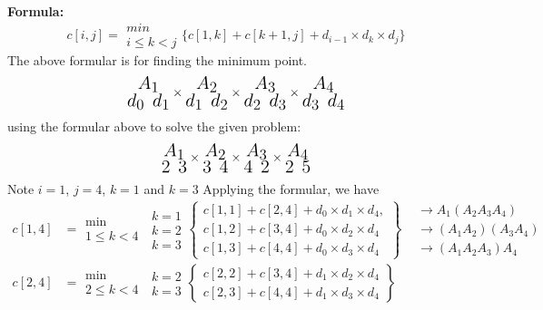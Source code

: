 \documentclass[12pt]{report}
\begin{document}
	\textbf{Formula:}
	$$c[i,j] = \substack{min\\{i\le k < j}}\bigg\{ c[1,k] + c[k+1,j] + d_{i-1} \times d_k\times d_j\bigg\}$$
	The above formular is for finding the minimum point.
	$$\huge\substack{A_1\\ {d_0 ~d_1}} \times \substack{A_2\\ {d_1 ~d_2}} \times \substack{A_3\\ {d_2 ~d_3}}\times \substack{A_4\\ {d_3 ~d_4}}$$
	using the formular above to solve the given problem:
	$$\huge\substack{A_1\\ {2 ~3}} \times \substack{A_2\\ {3 ~4}} \times \substack{A_3\\ {4 ~2}}\times \substack{A_4\\ {2 ~5}}$$
	Note $i=1$, $j = 4$, $k=1$ and $k = 3$
	Applying the formular, we have
	\begin{align*}
		c[1,4]&=\substack{\text{min}\\1\le k< 4}~\begin{aligned}k=1\\k=2\\k=3\end{aligned}
		\left\{
		\begin{aligned}
			c[1,1] + c[2,4] + d_{0} \times d_1\times d_4,\\
			c[1,2] + c[3,4] + d_{0} \times d_2\times d_4\\
			c[1,3] + c[4,4] + d_{0} \times d_3\times d_4
		\end{aligned}\right\}\begin{aligned}&\rightarrow A_1(A_2A_3A_4)\\
			&\rightarrow (A_1A_2)(A_3A_4)\\
			&\rightarrow (A_1A_2A_3)A_4
		\end{aligned}\\[0.7cm]
		c[2,4]&=\substack{\text{min}\\2\le k < 4}~\begin{aligned}k=2\\k=3\end{aligned}
		\left\{
		\begin{aligned}
			c[2,2] + c[3,4] + d_{1} \times d_2\times d_4\\
			c[2,3] + c[4,4] + d_{1} \times d_3\times d_4
		\end{aligned}\right\}
	\end{align*}
	
\end{document}
